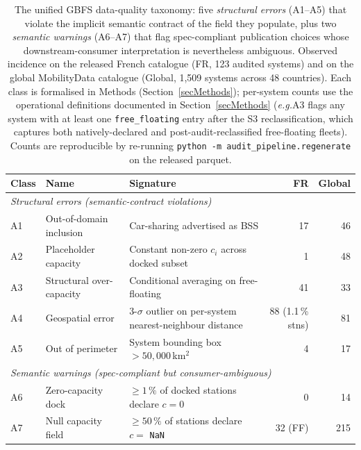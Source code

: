 \documentclass[11pt,a4paper]{article}
\newcommand{\eg}{\emph{e.g.}}
\begin{document}
\begin{table}[ht]
\centering
\caption{The unified GBFS data-quality taxonomy: five
\emph{structural errors} (A1--A5) that violate the implicit
semantic contract of the field they populate, plus two
\emph{semantic warnings} (A6--A7) that flag spec-compliant
publication choices whose downstream-consumer interpretation is
nevertheless ambiguous. Observed incidence on the released French
catalogue (FR, 123 audited systems) and on the global MobilityData
catalogue (Global, 1{,}509 systems across 48 countries). Each
class is formalised in Methods (Section~\ref{secMethods});
per-system counts use the operational definitions documented in
Section~\ref{secMethods} (\eg A3 flags any system with at least
one \texttt{free\_floating} entry after the S3 reclassification,
which captures both natively-declared and post-audit-reclassified
free-floating fleets). Counts are reproducible by re-running
\texttt{python -m audit\_pipeline.regenerate} on the released
parquet.}
\label{tab:anomalies}
\small
\begin{tabular}{@{}lllrr@{}}
\toprule
\textbf{Class} & \textbf{Name} & \textbf{Signature} & \textbf{FR} & \textbf{Global}\\
\midrule
\multicolumn{5}{l}{\textit{Structural errors (semantic-contract violations)}}\\
A1 & Out-of-domain inclusion       & Car-sharing advertised as BSS                          & 17         & 46        \\
A2 & Placeholder capacity          & Constant non-zero $c_i$ across docked subset           &  1         & 48        \\
A3 & Structural over-capacity      & Conditional averaging on free-floating                 & 41         & 33        \\
A4 & Geospatial error              & 3-$\sigma$ outlier on per-system nearest-neighbour distance & 88 (1.1\,\% stns) & 81 \\
A5 & Out of perimeter              & System bounding box $>50{,}000$\,km$^2$                &  4         & 17        \\
\midrule
\multicolumn{5}{l}{\textit{Semantic warnings (spec-compliant but consumer-ambiguous)}}\\
A6 & Zero-capacity dock            & $\geq 1\,\%$ of docked stations declare $c = 0$        &  0         & 14        \\
A7 & Null capacity field           & $\geq 50\,\%$ of stations declare $c = $ \texttt{NaN}  & 32 (FF)    & 215       \\
\bottomrule
\end{tabular}
\end{table}
\end{document}
